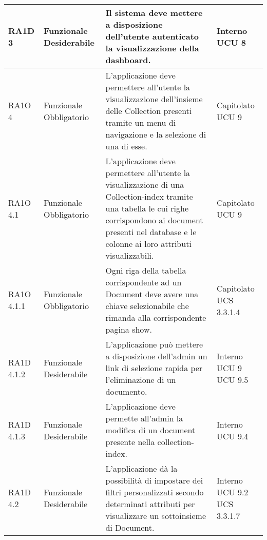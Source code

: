\begin{center}
\begin{longtable}{ | l | p{2cm} | p{5cm} | p{1.7cm} |}
				RA1D 3 & Funzionale \newline  Desiderabile  & Il sistema deve mettere a disposizione dell'utente autenticato la visualizzazione della dashboard. &  Interno \newline  UCU 8 \newline  \\ \hline      
				RA1O 4 & Funzionale \newline  Obbligatorio  & L'applicazione deve permettere all'utente la visualizzazione dell'insieme delle Collection presenti tramite un menu di navigazione e la selezione di una di esse. &  Capitolato \newline  UCU 9 \newline  \\ \hline      
				RA1O 4.1 & Funzionale \newline  Obbligatorio  & L'applicazione deve permettere all'utente la visualizzazione di una Collection-index tramite una tabella le cui righe corrispondono ai document presenti nel database e le colonne ai loro attributi visualizzabili. &  Capitolato \newline  UCU 9 \newline  \\ \hline      
				RA1O 4.1.1 & Funzionale \newline  Obbligatorio  & Ogni riga della tabella corrispondente ad un Document deve avere una chiave selezionabile che rimanda alla corrispondente pagina show. &  Capitolato \newline  UCS 3.3.1.4 \newline  \\ \hline      
				RA1D 4.1.2 & Funzionale \newline  Desiderabile  & L’applicazione può mettere a disposizione dell’admin un link di selezione rapida per l’eliminazione di un documento. &  Interno \newline  UCU 9 \newline  UCU 9.5 \newline  \\ \hline      
				RA1D 4.1.3 & Funzionale \newline  Desiderabile  & L’applicazione deve permette all’admin la modifica di un document presente nella collection-index. &  Interno \newline  UCU 9.4 \newline  \\ \hline      
				RA1D 4.2 & Funzionale \newline  Desiderabile  & L’applicazione dà la possibilità di impostare dei filtri personalizzati secondo determinati attributi per visualizzare un sottoinsieme di Document. &  Interno \newline  UCU 9.2 \newline  UCS 3.3.1.7 \newline  \\ \hline      

\end{longtable}
\end{center}
